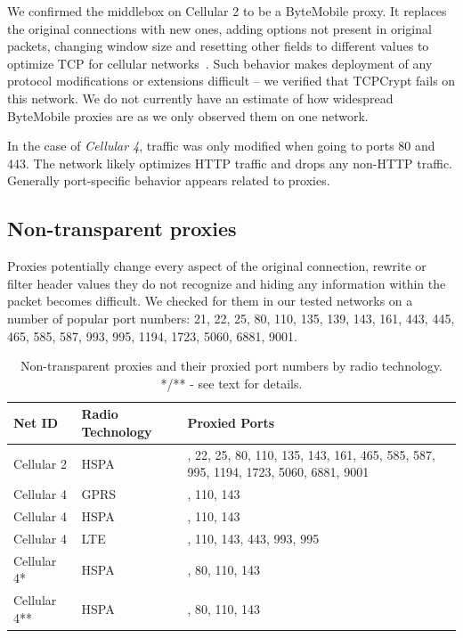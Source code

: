 \documentclass{sig-alternate-10pt}
\begin{document}
We confirmed the middlebox on Cellular 2 to be a ByteMobile proxy. It replaces the original connections with new ones, adding options not present in original packets, changing window size and resetting other fields to different values to optimize TCP for cellular networks~\cite{Ha:2006td}. Such behavior makes deployment of any protocol modifications or extensions difficult -- we verified that TCPCrypt fails on this network. We do not currently have an estimate of how widespread ByteMobile proxies are as we only observed them on one network.

In the case of \emph{Cellular 4}, traffic was only modified when going to ports 80 and 443. The network likely optimizes HTTP traffic and drops any non-HTTP traffic. Generally port-specific behavior appears related to proxies.

\subsection{Non-transparent proxies}
\label{sec:proxies}

Proxies potentially change every aspect of the original connection, rewrite or filter header values they do not recognize and hiding any information within the packet becomes difficult. We checked for them in our tested networks on a number of popular port numbers:
21, 22, 25, 80, 110, 135, 139, 143, 161, 443, 445, 465, 585, 587, 993, 995, 1194, 1723, 5060, 6881, 9001.

\begin{table}[t!]
{\small
\begin{center}
\begin{tabular}{| l | >{\centering\arraybackslash}m{1.8cm} | >{\centering\arraybackslash}m{3.7cm} |}
\hline
    \textbf{Net ID} & \textbf{Radio Technology} & \textbf{Proxied Ports} \\ \hline \hline
    Cellular 2      & HSPA                      & 21, 22, 25, 80, 110, 135, 143, 161, 465, 585, 587, 995, 1194, 1723, 5060, 6881, 9001 \\ \hline
    Cellular 4      & GPRS                      & 80, 110, 143 \\ \hline
    Cellular 4      & HSPA                      & 80, 110, 143 \\ \hline
    Cellular 4      & LTE                       & 80, 110, 143, 443, 993, 995 \\ \hline
    Cellular 4*     & HSPA                     & 25, 80, 110, 143 \\ \hline
    Cellular 4**    & HSPA                    & 25, 80, 110, 143 \\ \hline
\end{tabular}
\end{center}
}
\vspace{-4mm}
\caption{Non-transparent proxies and their proxied port numbers by radio technology. */** - see text for details.}
\label{tab:proxies}
\vspace{-4mm}
\end{table}
\end{document}

